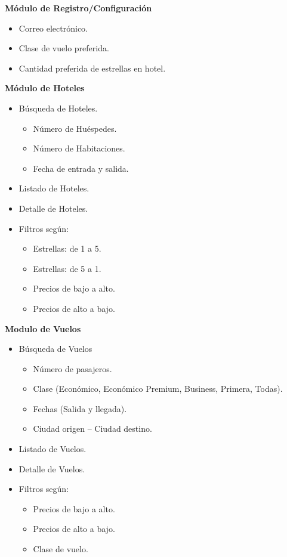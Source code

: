 \textbf{Módulo de Registro/Configuración}

\begin{itemize}
	\item Correo electrónico.
	\item Clase de vuelo preferida.
	\item Cantidad preferida de estrellas en hotel. 
\end{itemize}

\textbf{Módulo de Hoteles}

\begin{itemize}
	\item Búsqueda de Hoteles.
	\begin{itemize}
		\item Número de Huéspedes.
		\item Número de Habitaciones.
		\item Fecha de entrada y salida.
	\end{itemize}
	\item Listado de Hoteles.
	\item Detalle de Hoteles.
	\item Filtros según:
	\begin{itemize}
		\item Estrellas: de 1 a 5.
		\item Estrellas: de 5 a 1.
		\item Precios de bajo a alto.
		\item Precios de alto a bajo.
	\end{itemize}
\end{itemize}

\textbf{Modulo de Vuelos}
 
\begin{itemize}
	\item Búsqueda de Vuelos
	\begin{itemize}
		 \item Número de pasajeros.
		\item Clase (Económico, Económico Premium, Business, Primera, Todas).
		\item Fechas (Salida y llegada).
		\item Ciudad origen – Ciudad destino.
	\end{itemize}
	\item Listado de Vuelos.
	\item Detalle de Vuelos.
	\item Filtros según:
	\begin{itemize}
		\item Precios de bajo a alto.
		\item Precios de alto a bajo.
		\item Clase de vuelo.
	\end{itemize}
\end{itemize}

